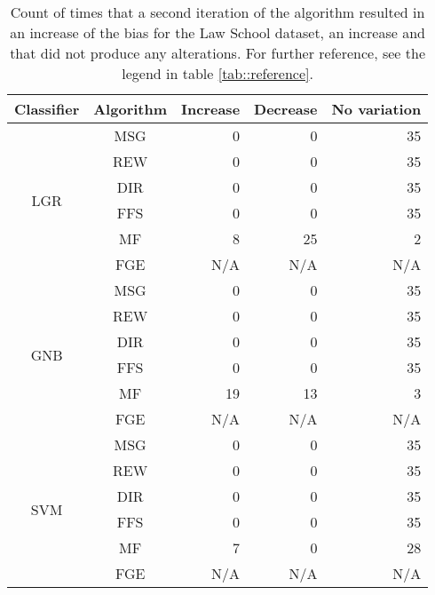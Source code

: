 \begin{table}[h!]
    \begin{center}
        \caption{Count of times that a second iteration of the algorithm resulted in an increase of the bias for the Law School dataset, an increase and that did not produce any alterations. For further reference, see the legend in table \ref{tab::reference}.}
        \label{tab::law_school::admission::multiple_iterations}
            \begin{tabular}{|c|c|r|r|r|}
                \hline
                \multirow{1}{*}{Classifier} & \multirow{1}{*}{Algorithm} & \multicolumn{1}{c|}{Increase} & \multicolumn{1}{c|}{Decrease} & \multicolumn{1}{c|}{No variation} \\
                \hline

                \multirow{6}{*}{LGR} & MSG & 0 & 0 & 35 \\
                \cline{2-5}
                    & REW & 0 & 0 & 35 \\
                \cline{2-5}
                    & DIR & 0 & 0 & 35 \\
                \cline{2-5}
                    & FFS &  0 & 0 & 35 \\
                \cline{2-5}
                    & MF & 8 & 25 & 2 \\
                \cline{2-5}
                    & FGE & N/A & N/A & N/A \\
                \cline{1-5}

                \multirow{6}{*}{GNB} & MSG & 0 & 0 & 35 \\
                \cline{2-5}
                    & REW & 0 & 0 & 35 \\
                \cline{2-5}
                    & DIR & 0 & 0 & 35 \\
                \cline{2-5}
                    & FFS &  0 & 0 & 35 \\
                \cline{2-5}
                    & MF & 19 & 13 & 3 \\
                \cline{2-5}
                    & FGE & N/A & N/A & N/A \\
                \cline{1-5}

                \multirow{6}{*}{SVM} & MSG & 0 & 0 & 35 \\
                \cline{2-5}
                    & REW & 0 & 0 & 35 \\
                \cline{2-5}
                    & DIR & 0 & 0 & 35 \\
                \cline{2-5}
                    & FFS &  0 & 0 & 35 \\
                \cline{2-5}
                    & MF & 7 & 0 & 28 \\
                \cline{2-5}
                    & FGE & N/A & N/A & N/A \\
                \cline{1-5}


\end{tabular}
\end{center}
\end{table}
